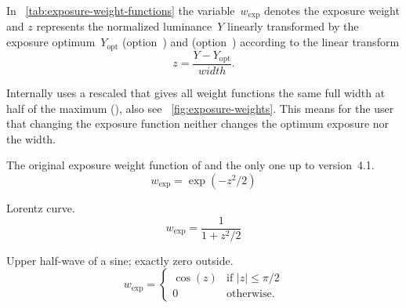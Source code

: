 \begin{codelist}

  In \tableName~\ref{tab:exposure-weight-functions} the variable~$w_{\mathrm{exp}}$ denotes the
  exposure weight and $z$ represents the normalized luminance~$Y$ linearly transformed by the
  exposure optimum~$Y_{\mathrm{opt}}$ (option~) and 
  (option~) according to the linear transform
  \begin{equation}\label{equ:linear-luminance-transform}
  z = \frac{Y - Y_{\mathrm{opt}}}{\mathit{width}}.
  \end{equation}

 Internally \App{} uses a rescaled  that gives all weight functions the same full
 width at half of the maximum (), also see \figureName~\ref{fig:exposure-weights}.
 This means for the user that changing the exposure function neither changes the optimum
 exposure nor the width.

  \begin{table}
    \begin{codelist}
    \item[\itempar{gauss \\ gaussian}]\itemend
      The original exposure weight function of \App{} and the only one up to version~4.1.
      \begin{equation}\label{equ:weight:gauss}
      w_{\mathrm{exp}} = \exp\left({-z^2 / 2}\right)
      \end{equation}

    \item[\itempar{lorentz \\ lorentzian}]\itemend
      Lorentz curve.
      \begin{equation}\label{equ:weight:lorentz}
      w_{\mathrm{exp}} = \frac{1}{1 + z^2 / 2}
      \end{equation}

    \item[\itempar{halfsine \\ half-sine}]\itemend
      Upper half-wave of a sine; exactly zero outside.
      \begin{equation}\label{equ:weight:halfsine}
      w_{\mathrm{exp}} =
      \left\{\begin{array}{cl}
      \cos(z) & \mbox{if } |z| \leq \pi/2 \\
      0       & \mbox{otherwise.}
      \end{array}\right.
      \end{equation}


\end{codelist}
\end{table}
\end{codelist}
